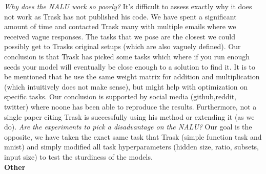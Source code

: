 \documentclass{article}
\begin{document}
\textit{Why does the NALU work so poorly?} It's difficult to assess exactly why it does not work as Trask has not published his code.
We have spent a significant amount of time and contacted Trask many with multiple emails where we received vague responses.
The tasks that we pose are the closest we could possibly get to Trasks original setups (which are also vaguely defined).
Our conclusion is that Trask has picked some tasks which where if you run enough seeds your model will eventually be close enough to a solution to find it.
It is to be mentioned that he use the same weight matrix for addition and multiplication (which intuitively does not make sense), but might help with optimization on specific tasks.
Our conclusion is supported by social media (github,reddit, twitter) where noone has been able to reproduce the results.
Furthermore, not a single paper citing Trask is successfully using his method or extending it (as we do).
\textit{Are the experiments to pick a disadvantage on the NALU?} Our goal is the opposite, we have taken the exact same task that Trask (simple function task and mnist) and simply modified all task hyperparameters (hidden size, ratio, subsets, input size) to test the sturdiness of the models.\\

\textbf{Other}\\



\end{document}
